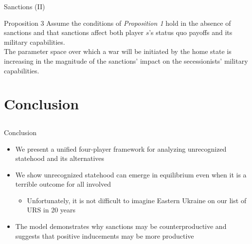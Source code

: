 \documentclass{beamer}
\begin{document}
\begin{frame}{Sanctions (II)}
\begin{beamerboxesrounded}[upper=palette tertiary, shadow=true]{Proposition 3}
  Assume the conditions of \emph{Proposition 1} hold in the absence of sanctions and that sanctions affect both player $s$'s status quo payoffs and its military capabilities. \\
	\pause
	The parameter space over which a war will be initiated by the home state is increasing in the magnitude of the sanctions' impact on the secessionists' military capabilities.
\end{beamerboxesrounded}

\end{frame}


\section{Conclusion}
\subsection{}
\begin{frame}{Conclusion}
\begin{itemize}[<+->]
	\item We present a unified four-player framework for analyzing unrecognized statehood and its alternatives
	\item We show unrecognized statehood can emerge in equilibrium even when it is a terrible outcome for all involved
		\begin{itemize}
			\item Unfortunately, it is not difficult to imagine Eastern Ukraine on our list of URS in 20 years
		\end{itemize}
	\item The model demonstrates why sanctions may be counterproductive and suggests that positive inducements may be more productive
\end{itemize}

\end{frame}
\end{document}
